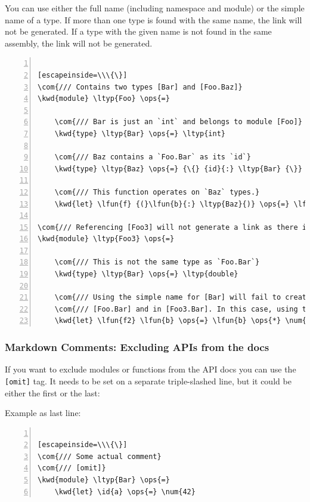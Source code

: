 \documentclass{article}
\newcommand{\id}[1]{\textcolor{black}{#1}}
\newcommand{\com}[1]{\textcolor{officegreen}{#1}}
\newcommand{\kwd}[1]{\textcolor{navy}{#1}}
\newcommand{\num}[1]{\textcolor{officegreen}{#1}}
\newcommand{\ops}[1]{\textcolor{purple}{#1}}
\begin{document}
You can use either the full name (including namespace and module) or the simple name of a type.
If more than one type is found with the same name, the link will not be generated.
If a type with the given name is not found in the same assembly, the link will not be generated.
\begin{lstlisting}[numbers=left]

[escapeinside=\\\{\}]
\com{/// Contains two types [Bar] and [Foo.Baz]}
\kwd{module} \ltyp{Foo} \ops{=}

    \com{/// Bar is just an `int` and belongs to module [Foo]}
    \kwd{type} \ltyp{Bar} \ops{=} \ltyp{int}

    \com{/// Baz contains a `Foo.Bar` as its `id`}
    \kwd{type} \ltyp{Baz} \ops{=} {\{} {id}{:} \ltyp{Bar} {\}}

    \com{/// This function operates on `Baz` types.}
    \kwd{let} \lfun{f} {(}\lfun{b}{:} \ltyp{Baz}{)} \ops{=} \lfun{b}{.}\id{id} \ops{*} \num{42}

\com{/// Referencing [Foo3] will not generate a link as there is no type with the name `Foo3`}
\kwd{module} \ltyp{Foo3} \ops{=}

    \com{/// This is not the same type as `Foo.Bar`}
    \kwd{type} \ltyp{Bar} \ops{=} \ltyp{double}

    \com{/// Using the simple name for [Bar] will fail to create a link because the name is duplicated in}
    \com{/// [Foo.Bar] and in [Foo3.Bar]. In this case, using the full name works.}
    \kwd{let} \lfun{f2} \lfun{b} \ops{=} \lfun{b} \ops{*} \num{50}

\end{lstlisting}

\subsubsection*{Markdown Comments: Excluding APIs from the docs}



If you want to exclude modules or functions from the API docs you can use the \texttt{[omit]} tag.
It needs to be set on a separate triple-slashed line, but it could be either the first or the last:


Example as last line:
\begin{lstlisting}[numbers=left]

[escapeinside=\\\{\}]
\com{/// Some actual comment}
\com{/// [omit]}
\kwd{module} \ltyp{Bar} \ops{=}
    \kwd{let} \id{a} \ops{=} \num{42}

\end{lstlisting}
\end{document}
